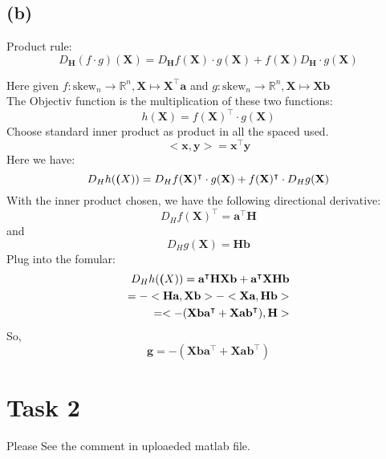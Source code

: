 \documentclass[12pt,a4paper,titlepage]{article}
\begin{document}
\subsection*{(b)}
Product rule:\\
\begin{equation}
	D_{\textbf{H}}(f \cdot g) (\textbf{X}) = D _{\textbf{H}} f(\textbf{X}) \cdot g(\textbf{X})+ f(\textbf{X})D _{\textbf{H}} \cdot g(\textbf{X})
\end{equation}

Here given $f:\textrm{skew}_{n} \to \mathbb{R}^{n}, \textbf{X} \mapsto \textbf{X}^\intercal \textbf{a}$ and $g:\textrm{skew}_{n} \to \mathbb{R}^{n}, \textbf{X} \mapsto \textbf{X} \textbf{b}$\\
The Objectiv function is the multiplication of these two functions:
\begin{displaymath}
	h(\textbf{X})=f(\textbf{X})^\intercal \cdot g(\textbf{X})
\end{displaymath}
Choose standard inner product as product in all the spaced used. 
\begin{displaymath}
	<\textbf{x}, \textbf{y}>=\textbf{x}^\intercal \textbf{y}
\end{displaymath}
Here we have:
\begin{equation}
	D_{H}h(\textbf(X))=D_{H}f(\textbf{X})^\intercal \cdot g(\textbf{X}) + f(\textbf{X})^\intercal \cdot D_{H}g(\textbf{X})
\end{equation}
With the inner product chosen, we have the following directional derivative:
\begin{equation}
	D_{H}f(\textbf{X})^\intercal=\textbf{a}^\intercal \textbf{H}
\end{equation}
and
\begin{equation}
	D_{H}g(\textbf{X})=\textbf{H} \textbf{b}
\end{equation}
Plug into the fomular:
\begin{equation}
\begin{split}
	D_{H}h(\textbf(X))=\textbf{a}^\intercal \textbf{H} \textbf{X} \textbf{b} + \textbf{a}^\intercal \textbf{X} \textbf{H} \textbf{b}\\
	=-<\textbf{H}\textbf{a}, \textbf{X}\textbf{b}>-<\textbf{X}\textbf{a}, \textbf{H}\textbf{b}>\\
	=<-(\textbf{X}\textbf{b}\textbf{a}^\intercal + \textbf{X}\textbf{a}\textbf{b}^\intercal), \textbf{H}>
\end{split}
\end{equation}
So, 
\begin{displaymath}
	\textbf{g}=-(\textbf{X}\textbf{b}\textbf{a}^\intercal + \textbf{X}\textbf{a}\textbf{b}^\intercal)
\end{displaymath}
\newpage
\section*{Task 2}
Please See the comment in uploaeded matlab file.
\end{document}
